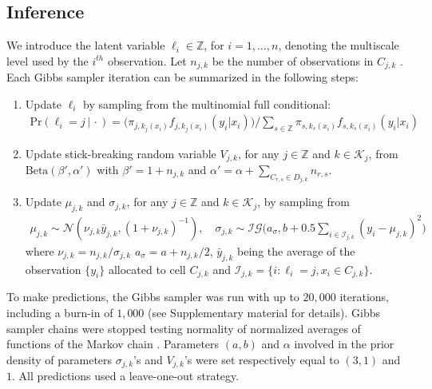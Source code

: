 \documentclass{article} %
\providecommand{\mc}[1]{\mathcal{#1}}
\newcommand{\ZZ}{\mathbb{Z}}
\begin{document}
\subsection{Inference}



We introduce the latent variable $\ell_i \in \ZZ$, for $i=1,\ldots,n$, denoting the multiscale level used by the $i^{th}$ observation.  
Let $n_{j,k}$ be  the number of observations in $C_{j,k}$ . Each Gibbs sampler iteration can be summarized in the following steps:

\begin{enumerate}
\item Update $\ell_i$ by sampling from the multinomial full conditional: 
\begin{align*}
\mbox{Pr}( \ell_i = j\, |\, \cdot) = \big(\pi_{j,k_j(x_i)}f_{j,k_j(x_i)}(y_i|x_i)\big) / \sum_{s\in \ZZ} \pi_{s,k_s(x_i)}f_{s,k_s(x_i)}(y_i | x_i)  \label{eq:prS}
\end{align*}
\item Update stick-breaking random variable $V_{j,k}$, for any $j \in \ZZ$ and $k \in \mc{K}_j$, from $\mbox{Beta}(\beta',\alpha')$ with $\beta'=1+n_{j,k}$ and $\alpha'=\alpha+\sum_{C_{r,s} \in D_{j,k}} n_{r,s}$.

\item Update $\mu_{j,k}$ and $\sigma_{j,k}$, for any $j \in \ZZ$ and $k \in \mc{K}_j$, by sampling from
\begin{align*}
	\mu_{j,k} \sim \mc{N}\left(\nu_{j,k} \bar{y}_{j,k}, (1+\nu_{j,k})^{-1}\right), \quad
	 \sigma_{j,k} \sim \mc{IG}\big(a_{\sigma},b+0.5 \textstyle{\sum}_{i \in \mc{I}_{j,k}} \left(y_{i}-\mu_{j,k}\right)^2\big)	
\end{align*}
where $\nu_{j,k}=n_{j,k}/\sigma_{j,k} $ $a_{\sigma}=a+n_{j,k}/2$, $\bar{y}_{j,k}$ being the average of the observation $\{y_i\}$ allocated to cell $C_{j,k}$ and $\mc{I}_{j,k}=\{i : \ell_i=j, x_i \in C_{j,k}\}$.

\end{enumerate}


To make predictions, the Gibbs sampler was run with up to $20,000$ iterations, including a burn-in of $1,000$ (see Supplementary material for details). Gibbs sampler chains were stopped testing normality of normalized averages of functions of the Markov chain \cite{Chauveau98anautomated}. Parameters $(a,b)$ and $\alpha$ involved in the prior density of parameters $\sigma_{j,k}$'s and $V_{j,k}$'s were set respectively equal to $(3,1)$ and $1$. All predictions used a leave-one-out strategy. %
\end{document}
